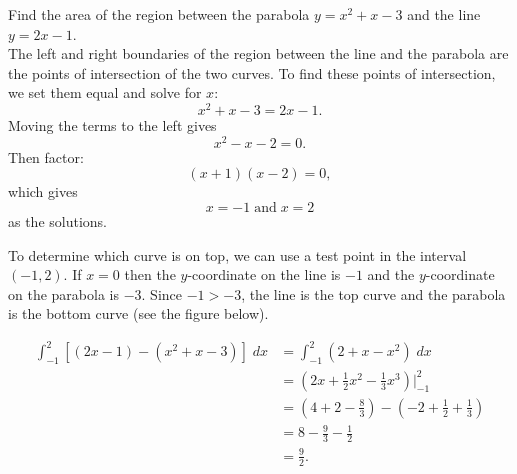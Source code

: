 \documentclass[handout]{ximera}
\begin{document}
\begin{example}[example 6]
Find the area of the region between the parabola $y = x^2 + x - 3$ and the line $y = 2x - 1$.\\
 The left and right boundaries of the region between the line and the parabola are 
the points of intersection of the two curves. To find these points of intersection, we set them equal and solve for $x$:
\[
x^2 + x - 3 = 2x-1.
\]
Moving the terms to the left gives
\[
 x^2 -x -2 = 0.
 \]
 Then factor:
 \[
  (x+1)(x-2) = 0,
  \]
  which gives
  \[
   x = -1 \;\text{and}\; x= 2
   \]
   as the solutions.

To determine which curve is on top, we can use a test point in the interval $(-1, 2)$. 
If $x = 0$ then the $y$-coordinate on the line is $-1$ and the $y$-coordinate 
on the parabola is $-3$. Since $-1 > -3$, the line is the top curve and the parabola is the bottom curve (see the figure below).


\begin{align*}
\int_{-1}^2 \left[(2x - 1) - (x^2 + x - 3)\right] \; dx &= \int_{-1}^2 \left(2 + x - x^2\right) \; dx \\
                                           &= \left(2x + \frac12 x^2 - \frac13 x^3 \right) \bigg|_{-1}^2 \\
                                           &= \left(4 + 2 - \frac83 \right) - \left(-2 + \frac12 + \frac13 \right)\\
                                           &= 8 - \frac93 - \frac12 \\
                                           & = \frac{9}{2}.
\end{align*}

\begin{center}
\end{center}
\end{example}
\end{document}
